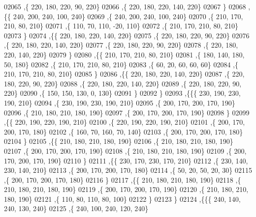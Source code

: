 \begin{DoxyCode}
02065     ,\{   220,   180,   220,    90,   220\}
02066     ,\{   220,   180,   220,   140,   220\}
02067     \}
02068    ,\{\{   240,   200,   240,   100,   240\}
02069     ,\{   240,   200,   240,   100,   240\}
02070     ,\{   210,   170,   210,    80,   210\}
02071     ,\{   110,    70,   110,   -20,   110\}
02072     ,\{   210,   170,   210,    80,   210\}
02073     \}
02074    ,\{\{   220,   180,   220,   140,   220\}
02075     ,\{   220,   180,   220,    90,   220\}
02076     ,\{   220,   180,   220,   140,   220\}
02077     ,\{   220,   180,   220,    90,   220\}
02078     ,\{   220,   180,   220,   140,   220\}
02079     \}
02080    ,\{\{   210,   170,   210,    80,   210\}
02081     ,\{   180,   140,   180,    50,   180\}
02082     ,\{   210,   170,   210,    80,   210\}
02083     ,\{    60,    20,    60,    60,    60\}
02084     ,\{   210,   170,   210,    80,   210\}
02085     \}
02086    ,\{\{   220,   180,   220,   140,   220\}
02087     ,\{   220,   180,   220,    90,   220\}
02088     ,\{   220,   180,   220,   140,   220\}
02089     ,\{   220,   180,   220,    90,   220\}
02090     ,\{   150,   150,   130,     0,   130\}
02091     \}
02092    \}
02093   ,\{\{\{   230,   190,   230,   190,   210\}
02094     ,\{   230,   190,   230,   190,   210\}
02095     ,\{   200,   170,   200,   170,   190\}
02096     ,\{   210,   180,   210,   180,   190\}
02097     ,\{   200,   170,   200,   170,   190\}
02098     \}
02099    ,\{\{   220,   190,   220,   190,   210\}
02100     ,\{   220,   190,   220,   190,   210\}
02101     ,\{   200,   170,   200,   170,   180\}
02102     ,\{   160,    70,   160,    70,   140\}
02103     ,\{   200,   170,   200,   170,   180\}
02104     \}
02105    ,\{\{   210,   180,   210,   180,   190\}
02106     ,\{   210,   180,   210,   180,   190\}
02107     ,\{   200,   170,   200,   170,   190\}
02108     ,\{   210,   180,   210,   180,   190\}
02109     ,\{   200,   170,   200,   170,   190\}
02110     \}
02111    ,\{\{   230,   170,   230,   170,   210\}
02112     ,\{   230,   140,   230,   140,   210\}
02113     ,\{   200,   170,   200,   170,   180\}
02114     ,\{    50,    20,    50,    20,    30\}
02115     ,\{   200,   170,   200,   170,   180\}
02116     \}
02117    ,\{\{   210,   180,   210,   180,   190\}
02118     ,\{   210,   180,   210,   180,   190\}
02119     ,\{   200,   170,   200,   170,   190\}
02120     ,\{   210,   180,   210,   180,   190\}
02121     ,\{   110,    80,   110,    80,   100\}
02122     \}
02123    \}
02124   ,\{\{\{   240,   140,   240,   130,   240\}
02125     ,\{   240,   100,   240,   120,   240\}

\end{DoxyCode}
